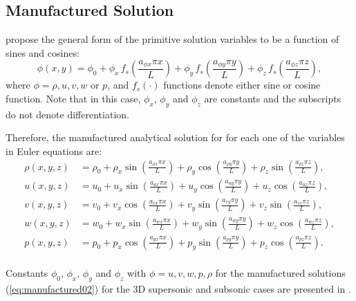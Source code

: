 \documentclass[10pt]{article}
\begin{document}
\begin{landscape}
\section{Manufactured Solution}

\citet{Roy2002} propose the general form of the primitive solution variables to be  a function of sines and cosines:
\begin{equation}
 \label{eq:manufactured01}
  \phi (x,y) = \phi_0+ \phi_x\, f_s \left(\frac{a_{\phi x} \pi x}{L} \right) +  \phi_y \,f_s\left(\frac{a_{\phi y} \pi y}{L}\right) + \phi_z \,f_s\left(\frac{a_{\phi z} \pi z}{L}\right),
\end{equation}
where $\phi=\rho,u,v,w$ or $p$, and $f_s(\cdot)$ functions denote either sine or cosine function. Note that in this case, $\phi_x$, $\phi_y$  and $\phi_z$ are constants  and the subscripts do not denote differentiation.

Therefore, the manufactured analytical solution for for each one of the variables in Euler equations are:
\begin{equation}
\begin{split}
\label{eq:manufactured02}
\rho\left( x ,y ,z\right) &=  \rho_{0}+ \rho_{x} \sin\left(\frac{a_{ \rho  x} \pi x}{L}\right)+ \rho_{y} \cos\left(\frac{a_{ \rho  y} \pi y}{L}\right) + \rho_{z} \sin\left(\frac{a_{ \rho  z} \pi z}{L}\right) ,\\
u\left( x ,y ,z\right) &= u_{0}+u_{x} \sin\left(\frac{a_{u  x} \pi x}{L}\right)+u_{y} \cos\left(\frac{a_{u  y} \pi y}{L}\right)+u_{z} \cos\left(\frac{a_{u  z} \pi z}{L}\right) ,\\
v\left( x ,y ,z\right) &= v_{0}+v_{x} \cos\left(\frac{a_{v  x} \pi x}{L}\right)+v_{y} \sin\left(\frac{a_{v  y} \pi y}{L}\right)+v_{z} \sin\left(\frac{a_{v  z} \pi z}{L}\right), \\
w\left( x ,y ,z\right) &= w_{0}+w_{x} \sin\left(\frac{a_{w  x} \pi x}{L}\right)+w_{y} \sin\left(\frac{a_{w  y} \pi y}{L}\right)+ w_{z} \cos\left(\frac{a_{w  z} \pi z}{L}\right) ,\\
p\left( x ,y ,z\right) &= p_{0}+p_{x} \cos\left(\frac{a_{p  x} \pi x}{L}\right)+p_{y} \sin\left(\frac{a_{p  y} \pi y}{L}\right)+ p_{z} \cos\left(\frac{a_{p  z} \pi z}{L}\right).\\
\end{split}
\end{equation}


Constants $\phi_0$, $\phi_x$, $\phi_y$ and $\phi_z$ with $\phi=u,v,w,p,\rho$ for the  manufactured solutions (\ref{eq:manufactured02}) for the 3D supersonic and subsonic cases are presented in \citet{Roy2002}.



\end{landscape}
\end{document}
